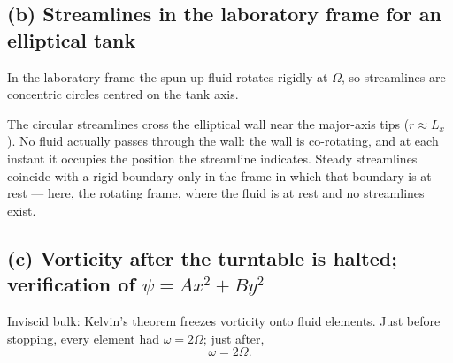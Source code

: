 \documentclass[11pt]{article}
\begin{document}
\subsection*{(b) Streamlines in the laboratory frame for an elliptical tank}

In the laboratory frame the spun-up fluid rotates rigidly at $\Omega$, so streamlines are concentric circles centred on the tank axis.
\begin{center}
\end{center}
The circular streamlines cross the elliptical wall near the major-axis tips ($r\approx L_x$). No fluid actually passes through the wall: the wall is co-rotating, and at each instant it occupies the position the streamline indicates. Steady streamlines coincide with a rigid boundary only in the frame in which that boundary is at rest --- here, the rotating frame, where the fluid is at rest and no streamlines exist.

\subsection*{(c) Vorticity after the turntable is halted; verification of $\psi=Ax^2+By^2$}

Inviscid bulk: Kelvin's theorem freezes vorticity onto fluid elements. Just before stopping, every element had $\omega=2\Omega$; just after,
\begin{equation}
\omega = 2\Omega.
\label{eq:postvort}
\end{equation}
\end{document}
